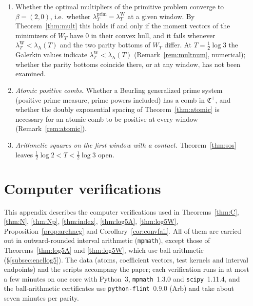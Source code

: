 \documentclass[11pt]{amsart}
\theoremstyle{definition}
\theoremstyle{remark}
\newcommand{\lamP}{\lambda^{\mathrm{prim}}_T}
\newcommand{\lamW}{\lambda^{\mathrm W}_T}
\newcommand{\lamA}{\lambda_{\mathrm A}(T)}
\begin{document}
\begin{enumerate}
$-\log\lamP\asymp e^{2T}$ mentioned after Problem~\ref{prob:A} is an order-of-magnitude statement for the
logarithm, not a two-sided asymptotic with sign.
\item Whether the optimal multipliers of the primitive problem converge to $\beta=(2,0)$, i.e.\ whether
$\lamP=\lamW$ at a given window. By Theorem~\ref{thm:mult} this holds if and only if the moment vectors of the
minimizers of $W_T$ have $0$ in their convex hull, and it fails whenever $\lamW<\lamA$ and the two parity bottoms
of $W_T$ differ. At $T=\frac12\log3$ the Galerkin values indicate $\lamW<\lamA$ (Remark~\ref{rem:multnum},
numerical); whether the parity bottoms coincide there, or at any window, has not been examined.
\item \emph{Atomic positive combs.} Whether a Beurling generalized prime system (positive prime measure, prime powers
included) has a comb in $\mathfrak C^+$, and whether the doubly exponential spacing of Theorem~\ref{thm:atomic} is necessary
for an atomic comb to be positive at every window (Remark~\ref{rem:atomic}).
\item \emph{Arithmetic squares on the first window with a contact.} Theorem~\ref{thm:sos} leaves
$\frac12\log2<T<\frac12\log3$ open.
\end{enumerate}

\appendix

\section{Computer verifications}\label{app:encl}

This appendix describes the computer verifications used in Theorems~\ref{thm:C}, \ref{thm:N},
\ref{thm:Np}, \ref{thm:index}, \ref{thm:log5A}, \ref{thm:log5W}, Proposition~\ref{prop:archneg} and
Corollary~\ref{cor:convfail}. All of them are carried out in outward-rounded interval arithmetic
(\texttt{mpmath}), except those of Theorems~\ref{thm:log5A} and \ref{thm:log5W}, which use ball arithmetic
(\S\ref{subsec:encllog5}). The data (atoms, coefficient vectors, test kernels and interval endpoints) and the
scripts accompany the paper; each verification runs in at most a few minutes on one core with Python~3,
\texttt{mpmath}~1.3.0 and \texttt{scipy}~1.11.4, and the ball-arithmetic certificates use
\texttt{python-flint}~0.9.0 (Arb) and take about seven minutes per parity.
\end{document}
